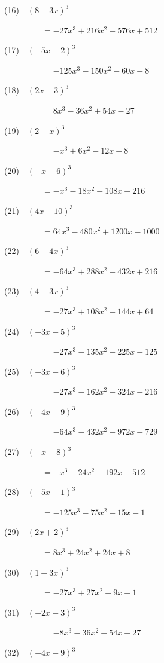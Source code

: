 \documentclass[a4j,twocolumn,10pt,fleqn]{jarticle}
\begin{document}
(16)~~$\left(8 - 3 x\right)^{3}$

~~~~~~~~~$=- 27 x^{3} + 216 x^{2} - 576 x + 512$

(17)~~$\left(- 5 x - 2\right)^{3}$

~~~~~~~~~$=- 125 x^{3} - 150 x^{2} - 60 x - 8$

(18)~~$\left(2 x - 3\right)^{3}$

~~~~~~~~~$=8 x^{3} - 36 x^{2} + 54 x - 27$

(19)~~$\left(2 - x\right)^{3}$

~~~~~~~~~$=- x^{3} + 6 x^{2} - 12 x + 8$

(20)~~$\left(- x - 6\right)^{3}$

~~~~~~~~~$=- x^{3} - 18 x^{2} - 108 x - 216$

(21)~~$\left(4 x - 10\right)^{3}$

~~~~~~~~~$=64 x^{3} - 480 x^{2} + 1200 x - 1000$

(22)~~$\left(6 - 4 x\right)^{3}$

~~~~~~~~~$=- 64 x^{3} + 288 x^{2} - 432 x + 216$

(23)~~$\left(4 - 3 x\right)^{3}$

~~~~~~~~~$=- 27 x^{3} + 108 x^{2} - 144 x + 64$

(24)~~$\left(- 3 x - 5\right)^{3}$

~~~~~~~~~$=- 27 x^{3} - 135 x^{2} - 225 x - 125$

(25)~~$\left(- 3 x - 6\right)^{3}$

~~~~~~~~~$=- 27 x^{3} - 162 x^{2} - 324 x - 216$

(26)~~$\left(- 4 x - 9\right)^{3}$

~~~~~~~~~$=- 64 x^{3} - 432 x^{2} - 972 x - 729$

(27)~~$\left(- x - 8\right)^{3}$

~~~~~~~~~$=- x^{3} - 24 x^{2} - 192 x - 512$

(28)~~$\left(- 5 x - 1\right)^{3}$

~~~~~~~~~$=- 125 x^{3} - 75 x^{2} - 15 x - 1$

(29)~~$\left(2 x + 2\right)^{3}$

~~~~~~~~~$=8 x^{3} + 24 x^{2} + 24 x + 8$

(30)~~$\left(1 - 3 x\right)^{3}$

~~~~~~~~~$=- 27 x^{3} + 27 x^{2} - 9 x + 1$

(31)~~$\left(- 2 x - 3\right)^{3}$

~~~~~~~~~$=- 8 x^{3} - 36 x^{2} - 54 x - 27$

(32)~~$\left(- 4 x - 9\right)^{3}$
\end{document}
